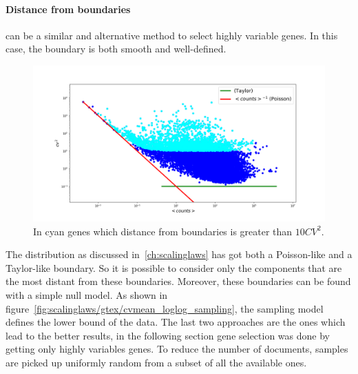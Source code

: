 \paragraph{Distance from boundaries} can be a similar and alternative method to select highly variable genes. In this case, the boundary is both smooth and well-defined.
\begin{figure}[htb!]
    \centering
    \includegraphics[width=0.8\linewidth]{pictures/topic/cvmean_oversampling.png}
    \caption{In \textcolor{pythoncyan}{cyan} genes which distance from boundaries is greater than $10 CV^2$.}
    \label{fig:topic/cvmean_oversampling}
\end{figure}
The distribution as discussed in~\ref{ch:scalinglaws} has got both a Poisson-like and a Taylor-like boundary. So it is possible to consider only the components that are the most distant from these boundaries. Moreover, these boundaries can be found with a simple null model. As shown in figure~\ref{fig:scalinglaws/gtex/cvmean_loglog_sampling}, the sampling model defines the lower bound of the data.
\FloatBarrier
The last two approaches are the ones which lead to the better results, in the following section gene selection was done by getting only highly variables genes.
To reduce the number of documents, samples are picked up uniformly random from a subset of all the available ones.